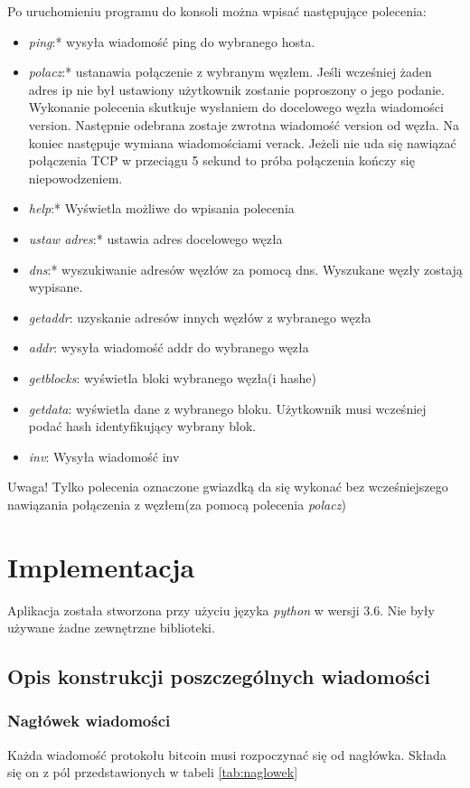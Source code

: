 \documentclass[a4paper,polish,12pt]{article}
\begin{document}
Po uruchomieniu programu do konsoli można wpisać następujące polecenia:
\begin{itemize}
\item \textit{ping}:* wysyła wiadomość ping do wybranego hosta.
\item \textit{polacz}:* ustanawia połączenie z wybranym węzłem. Jeśli wcześniej żaden adres ip nie był ustawiony użytkownik zostanie poproszony o jego podanie. Wykonanie polecenia skutkuje wysłaniem do docelowego węzła wiadomości version. Następnie odebrana zostaje zwrotna wiadomość version od węzła. Na koniec następuje wymiana wiadomościami verack. Jeżeli nie uda się nawiązać połączenia TCP w przeciągu 5 sekund to próba połączenia kończy się niepowodzeniem.
\item \textit{help}:* Wyświetla możliwe do wpisania polecenia
\item \textit{ustaw adres}:* ustawia adres docelowego węzła
\item \textit{dns}:* wyszukiwanie adresów węzłów za pomocą dns. Wyszukane węzły zostają wypisane.
\item \textit{getaddr}: uzyskanie adresów innych węzłów z wybranego węzła
\item \textit{addr}: wysyła wiadomość addr do wybranego węzła
\item \textit{getblocks}: wyświetla bloki wybranego węzła(i hashe)
\item \textit{getdata}:  wyświetla dane z wybranego bloku. Użytkownik musi wcześniej podać hash identyfikujący wybrany blok.
\item \textit{inv}: Wysyła wiadomość inv
\end{itemize}

Uwaga! Tylko polecenia oznaczone gwiazdką da się wykonać bez wcześniejszego nawiązania połączenia z węzłem(za pomocą polecenia \textit{polacz})

\section{Implementacja}
Aplikacja została stworzona przy użyciu języka \textit{python} w wersji 3.6. Nie były używane żadne zewnętrzne biblioteki.
\subsection{Opis konstrukcji poszczególnych wiadomości}

\subsubsection{Nagłówek wiadomości}
Każda wiadomość protokołu bitcoin musi rozpoczynać się od nagłówka. Składa się on z pól przedstawionych w tabeli \ref{tab:naglowek}
\end{document}
